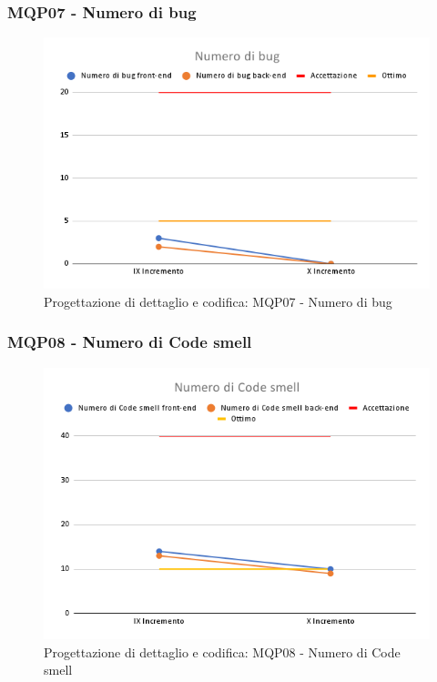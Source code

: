 \subsubsection{MQP07 - Numero di bug}
\begin{figure}[H]
    \centering
    \includegraphics[scale=0.50]{Sezioni/images/last_prodotto/Numero_di_bug.png}
    \caption{Progettazione di dettaglio e codifica: MQP07 - Numero di bug}
\end{figure}
\subsubsection{MQP08 - Numero di Code smell}
\begin{figure}[H]
    \centering
    \includegraphics[scale=0.50]{Sezioni/images/last_prodotto/Numero_di_Code_smell.png}
    \caption{Progettazione di dettaglio e codifica: MQP08 - Numero di Code smell}
\end{figure}
